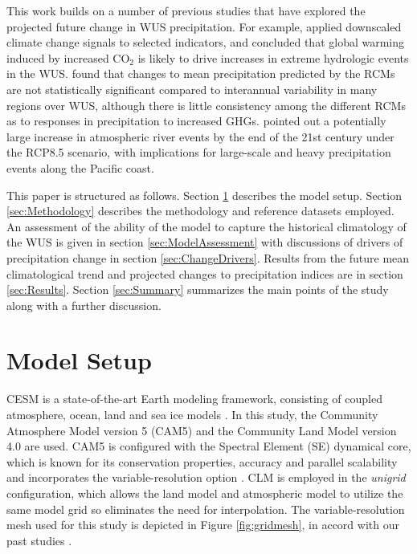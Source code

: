 \documentclass{ametsoc}
\begin{document}
This work builds on a number of previous studies that have explored the projected future change in WUS precipitation. For example, \cite{kim2005projection} applied downscaled climate change signals to selected indicators, and concluded that global warming induced by increased CO$_2$ is likely to drive increases in extreme hydrologic events in the WUS. \cite{duffy2006simulations} found that changes to mean precipitation predicted by the RCMs are not statistically significant compared to interannual variability in many regions over WUS, although there is little consistency among the different RCMs as to responses in precipitation to increased GHGs. \cite{gao2015dynamical} pointed out a potentially large increase in atmospheric river events by the end of the 21st century under the RCP8.5 scenario, with implications for large-scale and heavy precipitation events along the Pacific coast. 


This paper is structured as follows. Section \ref{sec:ModelSetup} describes the model setup.  Section \ref{sec:Methodology} describes the methodology and reference datasets employed. An assessment of the ability of the model to capture the historical climatology of the WUS is given in section \ref{sec:ModelAssessment} with discussions of drivers of precipitation change in section \ref{sec:ChangeDrivers}. Results from the future mean climatological trend and projected changes to precipitation indices are in section \ref{sec:Results}. Section \ref{sec:Summary} summarizes the main points of the study along with a further discussion.


\section{Model Setup} \label{sec:ModelSetup}

CESM is a state-of-the-art Earth modeling framework, consisting of coupled atmosphere, ocean, land and sea ice models \citep{CAM5Tech, hurrell2013community}. In this study, the Community Atmosphere Model version 5 (CAM5) \citep{CAM5Tech} and the Community Land Model version 4.0 \citep{CLM40Tech} are used.  CAM5 is configured with the Spectral Element (SE) dynamical core, which is known for its conservation properties, accuracy and parallel scalability \citep{dennis2011cam, taylor2011conservation} and incorporates the variable-resolution option \citep{zarzycki2014using}.  CLM is employed in the \textit{unigrid} configuration, which allows the land model and atmospheric model to utilize the same model grid so eliminates the need for interpolation. The variable-resolution mesh used for this study is depicted in Figure \ref{fig:gridmesh}, in accord with our past studies \citep{rhoades2016characterizing, huang2016evaluation, huang2016irrigation, rhoades2017projecting}.
\end{document}
